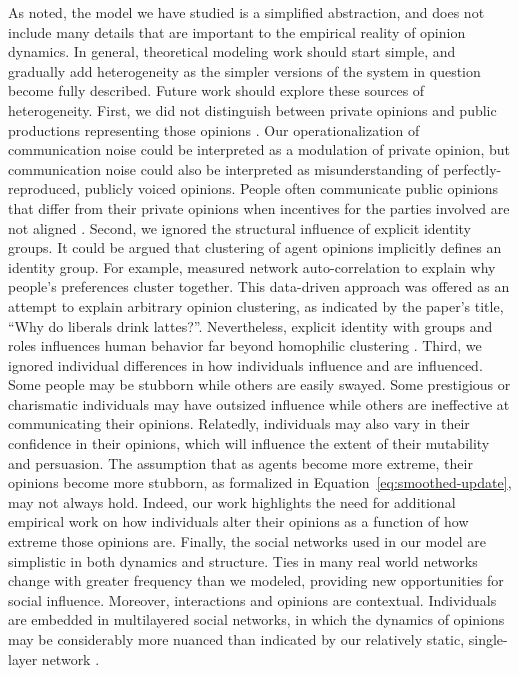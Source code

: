 As noted, the model we have studied is a simplified abstraction, and does not include many details that are important to the empirical reality of opinion dynamics. In general, theoretical modeling work should start simple, and gradually add heterogeneity as the simpler versions of the system in question become fully described. Future work should explore these sources of heterogeneity. 
First, we did not distinguish between private opinions and public productions
representing those opinions \cite{Nowak1990}. Our operationalization of communication
noise could be interpreted as a modulation of private opinion, 
but communication noise could also be interpreted as misunderstanding of perfectly-reproduced, publicly voiced opinions. People often communicate public opinions that differ from their private opinions 
when incentives for the parties involved are not aligned \cite{crawford1982strategic,pinker2008logic,smaldino2018evolution}.  
Second, we ignored the structural influence of explicit identity groups. It could be argued that clustering of agent opinions implicitly defines an identity group. For example, 
measured network auto-correlation to explain why people's preferences cluster
together. This data-driven approach was offered as an attempt to explain arbitrary opinion clustering, as indicated by the paper's title, ``Why do liberals drink lattes?''. Nevertheless, explicit identity with groups and roles influences human behavior far beyond homophilic clustering \cite{barth1969ethnic,berger2008drives,smaldino2018social}. 
Third, we ignored individual differences in how individuals influence and are influenced. Some people may be stubborn while others are easily swayed. 
Some prestigious or charismatic individuals may have outsized influence while others are ineffective at communicating their opinions. Relatedly, individuals may also vary in their confidence in their opinions, which will influence the extent of their mutability and persuasion. 
The assumption that as agents become more extreme, their opinions become more stubborn, as formalized in Equation~\ref{eq:smoothed-update}, may not always hold. Indeed, our work highlights the need for additional empirical work on how individuals alter their opinions as a function of how extreme those opinions are.
Finally, the social networks used in our model are simplistic in both dynamics and structure. Ties in many real world networks change with greater frequency than we modeled, providing new opportunities for social influence. Moreover, interactions and opinions are contextual. Individuals are embedded in multilayered social networks, in which the dynamics of opinions may be considerably more nuanced than indicated by our relatively static, single-layer network \cite{battiston2017layered,smaldino2018resilience}. 

